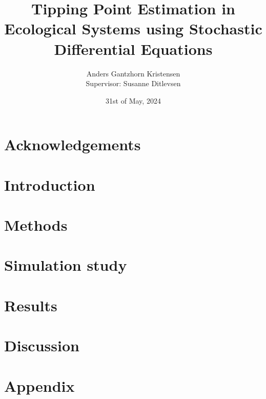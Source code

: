 \documentclass[11pt]{article}
\numberwithin{equation}{section}
\begin{document}
\pagestyle{fancy}
\fancyfoot{}
\fancyfoot[C]{\thepage}
\renewcommand{\headrulewidth}{0pt}
\renewcommand{\footrulewidth}{0pt}
\allowdisplaybreaks



\title{Tipping Point Estimation in Ecological Systems using Stochastic Differential Equations}
\author{Anders Gantzhorn Kristensen \\
Supervisor: Susanne Ditlevsen}
\date{31st of May, 2024}
\maketitle
\section*{Acknowledgements}

\newpage
\begin{abstract}
    
\end{abstract}
\newpage
\tableofcontents
\newpage
\section{Introduction}\label{Introduction}

\section{Methods}\label{Methods}

\section{Simulation study}\label{Simulaton study}

\section{Results}\label{Results}

\section{Discussion}\label{Discussion}

\newpage

\newpage
\appendix
\section*{Appendix}\label{Appendix}

\end{document}
